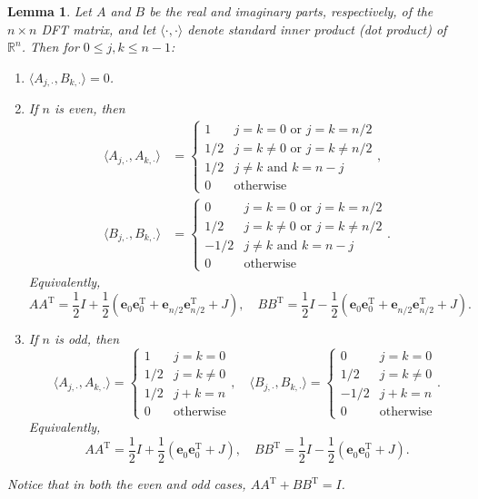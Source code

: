 \documentclass[12pt,notitlepage]{report}
\newcommand{\trans}{\mathrm{T}}	%
\newtheorem{lemma}{Lemma}[section]
\begin{document}
\begin{lemma}
\label{lem:Inner products}
Let $A$ and $B$ be the real and imaginary parts, respectively, of the $n \times n$ DFT matrix, and let $\langle\cdot,\cdot\rangle$ denote standard inner product (dot product) of $\mathbb{R}^n$. Then for $0 \leq j,k \leq n-1$:
\begin{enumerate}[label=(\roman*)]
\item $\langle A_{j,\cdot}, B_{k,\cdot}\rangle = 0$.
\item If $n$ is even, then 
\begin{align*}
\langle A_{j,\cdot}, A_{k,\cdot}\rangle &= \begin{cases}
1 & j = k = 0 \text{ or } j = k = n/2 \\ 
1/2 & j = k \neq 0 \text{ or } j = k \neq n/2 \\ 
1/2 & j \neq k \text{ and } k = n - j \\ 
0 & \text{otherwise} \end{cases}, \\
\langle B_{j,\cdot}, B_{k,\cdot}\rangle &= \begin{cases}
0 & j = k = 0 \text{ or } j = k = n/2 \\ 
1/2 & j = k \neq 0 \text{ or } j = k \neq n/2 \\ 
-1/2 &  j \neq k \text{ and } k = n - j \\ 
0 & \text{otherwise} \end{cases}.
\end{align*}
Equivalently,
\[AA^\trans = \frac{1}{2}I + \frac{1}{2}\left(\bm{e}_0^{}\bm{e}_0^\trans + \bm{e}_{n/2}^{}\bm{e}_{n/2}^\trans + J\right), \quad BB^\trans = \frac{1}{2}I - \frac{1}{2}\left(\bm{e}_0^{}\bm{e}_0^\trans + \bm{e}_{n/2}^{}\bm{e}_{n/2}^\trans + J\right).\]
\item If $n$ is odd, then
\[\langle A_{j,\cdot}, A_{k,\cdot}\rangle = \begin{cases}
1 & j = k = 0 \\ 
1/2 & j = k \neq 0 \\
1/2 & j+k = n \\
0 & \text{otherwise} \end{cases}, \quad 
\langle B_{j,\cdot}, B_{k,\cdot}\rangle = \begin{cases}
0 & j = k = 0 \\ 
1/2 & j = k \neq 0 \\
-1/2 & j+k = n \\
0 & \text{otherwise} \end{cases}.\]
Equivalently,
\[AA^\trans = \frac{1}{2}I + \frac{1}{2}\left(\bm{e}_0^{}\bm{e}_0^\trans + J\right), \quad BB^\trans = \frac{1}{2}I - \frac{1}{2}\left(\bm{e}_0^{}\bm{e}_0^\trans + J\right).\]
\end{enumerate}
Notice that in both the even and odd cases, $AA^\trans + BB^\trans = I$.
\end{lemma}
\end{document}
